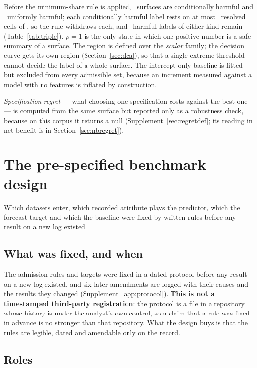 \documentclass[11pt,3p,review,authoryear]{elsarticle}
\theoremstyle{definition}
\begin{document}
Before the minimum-share rule is applied, \nCondHarmful\ surfaces
are conditionally harmful and \nUniformlyHarmful\ uniformly harmful; each
conditionally harmful label rests on at most \nCondHarmfulResolvedMax\
resolved cells of \nHelpdeskFamily, so the rule withdraws each, and
\nCondHarmfulMinShare\ harmful labels of either kind remain
(Table~\ref{tab:triple}). $\rho = 1$ is the only state in which one positive
number is a safe summary of a surface. The region is defined over the
\emph{scalar} family; the decision curve gets its own region
(Section~\ref{sec:dca}), so that a single extreme threshold cannot decide the
label of a whole surface. The intercept-only baseline is fitted but excluded
from every admissible set, because an increment measured against a model with
no features is inflated by construction.

\emph{Specification regret} --- what choosing one specification
costs against the best one --- is computed from the same surface but reported
only as a robustness check, because on this corpus it returns a null
(Supplement~\ref{sec:regretdef}; its reading in net benefit is in
Section~\ref{sec:nbregret}).

\section{The pre-specified benchmark design}
\label{sec:design}

Which datasets enter, which recorded attribute plays the predictor, which the
forecast target and which the baseline were fixed by written rules before any
result on a new log existed.

\subsection{What was fixed, and when}

The admission rules and targets were fixed in a dated protocol before any
result on a new log existed, and six later amendments are logged with their causes
and the results they changed (Supplement~\ref{app:protocol}). \textbf{This is
not a timestamped third-party registration}: the protocol is a file in a
repository whose history is under the analyst's own control, so a claim that
a rule was fixed in advance is no stronger than that repository. What the
design buys is that the rules are legible, dated and amendable only on the
record.

\subsection{Roles}
\end{document}

